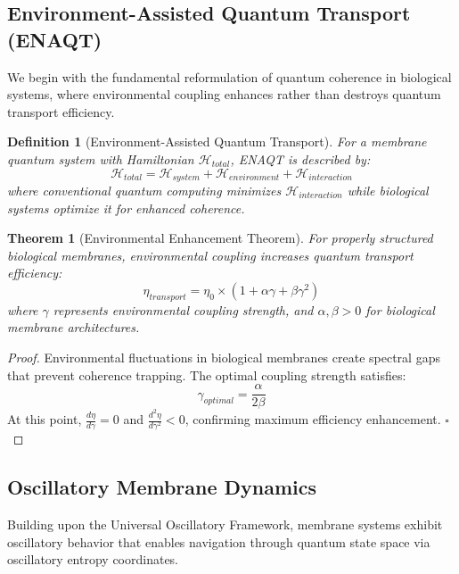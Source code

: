 \documentclass[12pt,a4paper]{article}
\newtheorem{theorem}{Theorem}
\newtheorem{definition}{Definition}
\begin{document}
\subsection{Environment-Assisted Quantum Transport (ENAQT)}

We begin with the fundamental reformulation of quantum coherence in biological systems, where environmental coupling enhances rather than destroys quantum transport efficiency.

\begin{definition}[Environment-Assisted Quantum Transport]
For a membrane quantum system with Hamiltonian $\mathcal{H}_{total}$, ENAQT is described by:
\begin{equation}
\mathcal{H}_{total} = \mathcal{H}_{system} + \mathcal{H}_{environment} + \mathcal{H}_{interaction}
\end{equation}
where conventional quantum computing minimizes $\mathcal{H}_{interaction}$ while biological systems optimize it for enhanced coherence.
\end{definition}

\begin{theorem}[Environmental Enhancement Theorem]
For properly structured biological membranes, environmental coupling increases quantum transport efficiency:
\begin{equation}
\eta_{transport} = \eta_0 \times (1 + \alpha \gamma + \beta \gamma^2)
\end{equation}
where $\gamma$ represents environmental coupling strength, and $\alpha, \beta > 0$ for biological membrane architectures.
\end{theorem}

\begin{proof}
Environmental fluctuations in biological membranes create spectral gaps that prevent coherence trapping. The optimal coupling strength satisfies:
\begin{equation}
\gamma_{optimal} = \frac{\alpha}{2\beta}
\end{equation}
At this point, $\frac{d\eta}{d\gamma} = 0$ and $\frac{d^2\eta}{d\gamma^2} < 0$, confirming maximum efficiency enhancement. $\square$
\end{proof}

\subsection{Oscillatory Membrane Dynamics}

Building upon the Universal Oscillatory Framework, membrane systems exhibit oscillatory behavior that enables navigation through quantum state space via oscillatory entropy coordinates.
\end{document}
